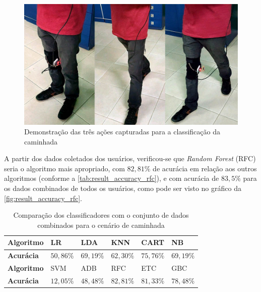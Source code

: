 \begin{figure}[ht]
	\caption{\label{fig:result_estados}Demonstração das três ações capturadas para a classificação da caminhada}
	\begin{center}
		\includegraphics[width=.8\textwidth]{resources/result_estados}
	\end{center}
\end{figure}

A partir dos dados coletados dos usuários, verificou-se que \textit{Random Forest} (RFC) seria o algoritmo mais apropriado, com \(82{,}81\%\) de acurácia em relação aos outros algoritmos (conforme a \autoref{tab:result_accuracy_rfc}), e com acurácia de \(83{,}5\%\) para os dados combinados de todos os usuários, como pode ser visto no gráfico da \autoref{fig:result_accuracy_rfc}.

\begin{table}[ht]
	\caption{Comparação dos classificadores com o conjunto de dados combinados para o cenário de caminhada}%
	\label{tab:result_accuracy_rfc}
	\begin{tabularx}{\textwidth}{X X X X X X}
		\toprule
		\textbf{Algoritmo} & LR            & LDA           & KNN           & CART          & NB            \\ \midrule
		\textbf{Acurácia}  & \(50{,}86\%\)   &   \(69{,}19\%\)   &   \(62{,}30\%\)   &   \(75{,}76\%\)   &   \(69{,}19\%\) \\ \bottomrule \toprule
		\textbf{Algoritmo} & SVM           & ADB           & RFC           & ETC           & GBC           \\ \midrule
		\textbf{Acurácia}  & \(12{,}05\%\)   &   \(48{,}48\%\)   &   \(82{,}81\%\)   &   \(81{,}33\%\)   &   \(78{,}48\%\) \\ \bottomrule
	\end{tabularx}
\end{table}

